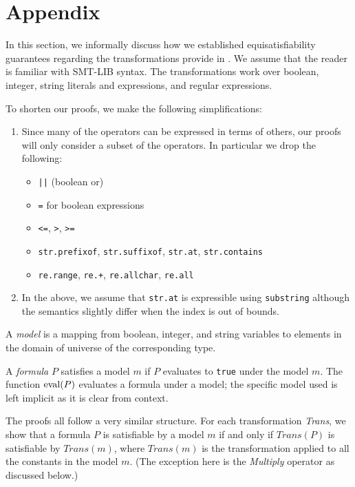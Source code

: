 \section{Appendix}

In this section, we informally discuss how we established
equisatisfiability guarantees regarding the transformations provide in
\fuzzer{}. We assume that the reader is familiar with SMT-LIB
syntax. The transformations work over boolean, integer, string
literals and expressions, and regular expressions.

To shorten our proofs, we make the following simplifications:
\begin{enumerate}
  \item
    Since many of the operators can be expressed in terms of others,
    our proofs will only consider a subset of the operators. In
    particular we drop the following:
    \begin{itemize}
      \item \texttt{||} (boolean or)
      \item \texttt{=} for boolean expressions
      \item \texttt{<=}, \texttt{>}, \texttt{>=}
      \item \texttt{str.prefixof}, \texttt{str.suffixof}, \texttt{str.at}, \texttt{str.contains}
      \item \texttt{re.range}, \texttt{re.+}, \texttt{re.allchar}, \texttt{re.all}
    \end{itemize}

  \item
    In the above, we assume that \texttt{str.at} is expressible using
    \texttt{substring} although the semantics slightly differ when the index is
    out of bounds.
\end{enumerate}

\begin{definition}
  A \emph{model} is a mapping from boolean, integer, and string variables to
elements in the domain of universe of the corresponding type.
\end{definition}

\begin{definition}
  A \emph{formula} $P$ satisfies a model $m$ if $P$ evaluates to
  \texttt{true} under the model $m$. The function $\operatorname{eval} (P)$
  evaluates a formula under a model; the specific model used is left
  implicit as it is clear from context.
\end{definition}

The proofs all follow a very similar structure. For each
transformation \textit{Trans}, we show that a formula $P$ is
satisfiable by a model $m$ if and only if $\textit{Trans}(P)$ is
satisfiable by $\textit{Trans}(m)$, where $\textit{Trans}(m)$ is the
transformation applied to all the constants in the model $m$. (The
exception here is the \textit{Multiply} operator as discussed below.)

